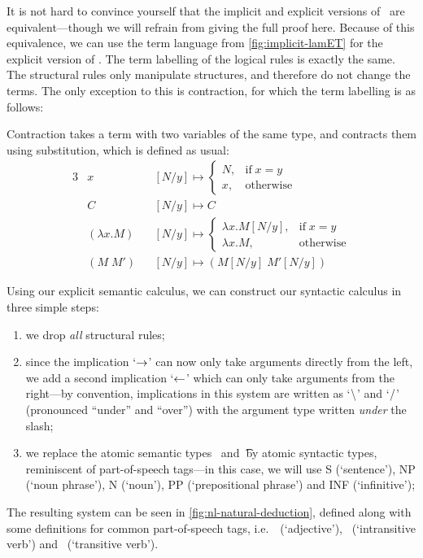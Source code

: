 It is not hard to convince yourself that the implicit and explicit
versions of \lamET\ are equivalent---though we will refrain from
giving the full proof here.
Because of this equivalence, we can use the term language from
\autoref{fig:implicit-lamET} for the explicit version of
\lamET.
The term labelling of the logical rules is exactly the same. The
structural rules only manipulate structures, and therefore do not
change the terms. The only exception to this is contraction, for which
the term labelling is as follows:
\begin{prooftree}
\end{prooftree}
Contraction takes a term with two variables of the same type, and
contracts them using substitution, which is defined as usual:
\begin{alignat*}{3}
  &x             &&[N/y] \mapsto
  \begin{cases}
    N, &\text{if}\;x=y\\
    x, &\text{otherwise}
  \end{cases}
  \\
  &C             &&[N/y] \mapsto C\\
  &(\lambda x.M) &&[N/y] \mapsto
  \begin{cases}
    \lambda x.M[N/y], &\text{if}\;x=y\\
    \lambda x.M,      &\text{otherwise}
  \end{cases}
  \\
  &(M\;M')       &&[N/y] \mapsto (M[N/y]\;M'[N/y])
\end{alignat*}

Using our explicit semantic calculus, we can construct our syntactic
calculus in three simple steps:
\begin{enumerate}
\item%
  we drop \emph{all} structural rules;
\item%
  since the implication `$\ra$' can now only take arguments directly
  from the left, we add a second implication `$\la$' which can only
  take arguments from the right---by convention, implications in this
  system are written as `$\impr$' and `$\impl$' (pronounced ``under''
  and ``over'') with the argument type written \emph{under} the slash;
\item%
  we replace the atomic semantic types \e\ and \t\ by atomic syntactic
  types, reminiscent of part-of-speech tags---in this case, we will
  use S (`sentence'), NP (`noun phrase'), N (`noun'), PP
  (`prepositional phrase') and INF (`infinitive');
\end{enumerate}
The resulting system can be seen in \autoref{fig:nl-natural-deduction},
defined along with some definitions for common part-of-speech tags,
i.e.\ \A\ (`adjective'), \IV\ (`intransitive verb') and \TV\
(`transitive verb').


